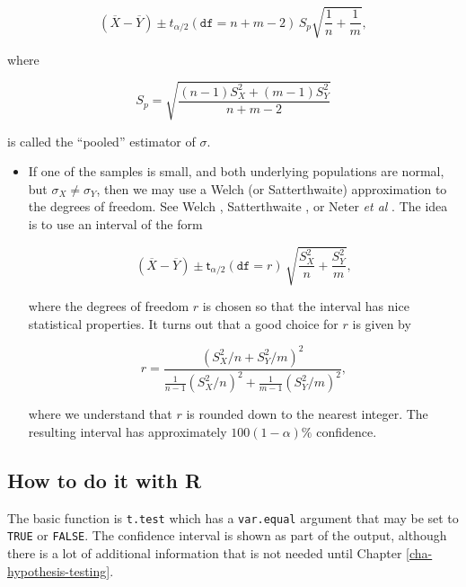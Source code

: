 \documentclass[]{book}
\providecommand{\tightlist}{%
  \setlength{\itemsep}{0pt}\setlength{\parskip}{0pt}}
\numberwithin{equation}{chapter}
\numberwithin{figure}{chapter}
\theoremstyle{plain}
\theoremstyle{definition}
\theoremstyle{remark}
\theoremstyle{definition}
\theoremstyle{definition}
\theoremstyle{remark}
\begin{document}
\begin{itemize}
  \begin{equation}
    \left(\overline{X}-\overline{Y}\right)\pm t_{\alpha/2}(\mathtt{df}=n+m-2)\, S_{p}\sqrt{\frac{1}{n}+\frac{1}{m}},
    \end{equation}

  where

  \begin{equation}
    S_{p}=\sqrt{\frac{(n-1)S_{X}^{2}+(m-1)S_{Y}^{2}}{n+m-2}}
    \end{equation}

  is called the ``pooled'' estimator of \(\sigma\).

  \begin{itemize}
  \tightlist
  \item
    If one of the samples is small, and both underlying populations are
    normal, but \(\sigma_{X}\neq\sigma_{Y}\), then we may use a Welch
    (or Satterthwaite) approximation to the degrees of freedom. See
    Welch \autocite{Welch1947}, Satterthwaite
    \autocite{Satterthwaite1946}, or Neter \emph{et al}
    \autocite{Neter1996}. The idea is to use an interval of the form

    \begin{equation}
      \left(\overline{X}-\overline{Y}\right)\pm\mathsf{t}_{\alpha/2}(\mathtt{df}=r)\,\sqrt{\frac{S_{X}^{2}}{n}+\frac{S_{Y}^{2}}{m}},
      \end{equation}

    where the degrees of freedom \(r\) is chosen so that the interval
    has nice statistical properties. It turns out that a good choice for
    \(r\) is given by

    \begin{equation}
      r=\frac{\left(S_{X}^{2}/n+S_{Y}^{2}/m\right)^{2}}{\frac{1}{n-1}\left(S_{X}^{2}/n\right)^{2}+\frac{1}{m-1}\left(S_{Y}^{2}/m\right)^{2}},
      \end{equation}

    where we understand that \(r\) is rounded down to the nearest
    integer. The resulting interval has approximately
    \(100(1-\alpha)\%\) confidence.
  \end{itemize}
\end{itemize}

\subsection{How to do it with R}\label{how-to-do-it-with-r-35}

The basic function is \texttt{t.test} which has a \texttt{var.equal}
argument that may be set to \texttt{TRUE} or \texttt{FALSE}. The
confidence interval is shown as part of the output, although there is a
lot of additional information that is not needed until Chapter
\ref{cha-hypothesis-testing}.
\end{document}

